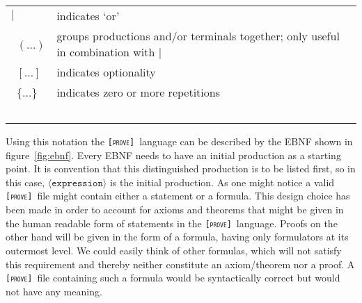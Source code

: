\documentclass[british]{article}
\newenvironment{graph}{\captionsetup{type=figure, skip=0pt}}{}
\newcommand\m[1]{\pcode{\texttt{#1}}}
\newcommand\name{\texttt{\textsc{[prove]}}}
\newcommand\tfigure[3]{%
	\begin{graph}
	\begin{tcolorbox}[breakable, colbacktitle=manatee,%
		title=\captionof{figure}%
	{#1}\label{fig:#2}]%
	#3
	\end{tcolorbox}%
	\end{graph}
}
\providecommand{\tabularnewline}{\\}
\begin{document}
\medskip{}

\tfigure{Meta characters of the Extended Backus-Naur Form}{meta}{%
	\begin{doublespace}
	\begin{tabular}{l|l}
	$|$ & indicates `or'\tabularnewline\
	$(\dots)$ & groups productions and/or terminals together; only useful in
	combination with $|$\tabularnewline\
	$[\dots]$ & indicates optionality\tabularnewline\
	$\{\dots\}$ & indicates zero or more repetitions\tabularnewline\
	\end{tabular}
	\end{doublespace}
}

%
\tfigure{Extended Backus-Naur Form of the \name\ language}{ebnf}{%

\vspace{2mm}
}

Using this notation the \name\ language can be described by the EBNF shown in
figure~\ref{fig:ebnf}.  Every EBNF needs to have an initial production as a
starting point.  It is convention that this distinguished production is to be
listed first, so in this case, $\langle\texttt{expression}\rangle$ is the
initial production. As one might notice a valid \name\ file might contain either
a statement or a formula. This design choice has been made in order to account
for axioms and theorems that might be given in the human readable form of
statements in the \name\ language.  Proofs on the other hand will be given in
the form of a formula, having only \m{=>} formulators at its outermost level. We
could easily think of other formulas, which will not satisfy this requirement
and thereby neither constitute an axiom/theorem nor a proof. A \name\ file
containing such a formula would be syntactically correct but would not have any
meaning.
\end{document}
